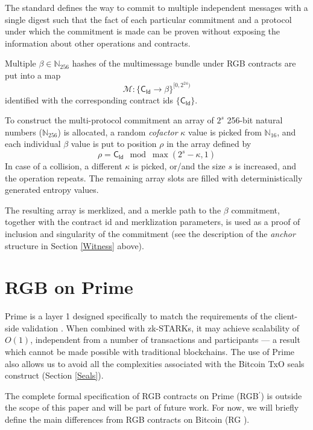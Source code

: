 \documentclass[9pt,oneside]{amsart}
\def\bitcoin{%
  \leavevmode
  \vtop{\offinterlineskip %
    \setbox0=\hbox{B}%
    \setbox2=\hbox to\wd0{\hfil\hskip-.03em
    \vrule height .3ex width .15ex\hskip .08em
    \vrule height .3ex width .15ex\hfil}
    \vbox{\copy2\box0}\box2}}
\begin{document}
\begin{multicols}{2}
The standard defines the way to commit to multiple independent messages
with a single digest such that the fact of each particular commitment
and a protocol under which the commitment is made can be proven without
exposing the information about other operations and contracts.

Multiple $\beta \in \mathbb{N}_{256}$ hashes of the multimessage bundle under
RGB contracts are put into a map
\noindent
\begin{equation}
\mathcal{M}: \{ \mathsf{C_{Id}} \rightarrow \beta \}^{[0, 2^{24})}
\end{equation}
\noindent
identified with the corresponding contract ids $\{ \mathsf{C_{Id}} \}$.

To construct the multi-protocol commitment an array of $2^s$
256-bit natural numbers ($\mathbb{N}_{256}$) is allocated,
a random \emph{cofactor} $\kappa$ value is picked from $\mathbb{N}_{16}$,
and each individual $\beta$ value is put to position $\rho$ in the array defined by
\noindent
\begin{equation}
    \rho = \mathsf{C_{Id}} \mod \max(2^s - \kappa, 1)
\end{equation}
\noindent
In case of a collision, a different $\kappa$ is picked,
or/and the size $s$ is increased, and the operation repeats.
The remaining array slots are filled with deterministically generated entropy values.

The resulting array is merklized, and a merkle path to the $\beta$ commitment,
together with the contract id and merklization parameters, is used as a proof of
inclusion and singularity of the commitment
(see the description of the \emph{anchor} structure in Section \ref{Witness} above).


\section{RGB on Prime}

Prime is a layer 1 designed specifically to match the requirements of the client-side validation \cite{Prime}.
When combined with zk-STARKs, it may achieve scalability of $O(1)$,
independent from a number of transactions and participants \cite{Prime} —
a result which cannot be made possible with traditional blockchains.
The use of Prime also allows us to avoid all the complexities associated
with the Bitcoin TxO seals construct (Section \ref{Seals}).

The complete formal specification of RGB contracts on Prime (RGB$^\prime$)
is outside the scope of this paper and will be part of future work.
For now, we will briefly define the main differences from RGB contracts on Bitcoin (RG\bitcoin).


\end{multicols}
\end{document}
